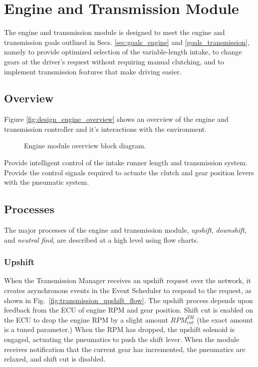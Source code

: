 \section{Engine and Transmission Module\label{sec:engine_transmission_design}}

The engine and transmission module is designed to meet the engine and transmission goals outlined in Secs. \ref{sec:goals_engine} and \ref{goals_transmission}, namely to provide optimized selection of the variable-length intake, to change gears at the driver's request without requiring manual clutching, and to implement transmission features that make driving easier. 

\subsection{Overview}

Figure \ref{fig:design_engine_overview} shows an overview of the engine and transmission controller and it's interactions with the environment.

\begin{figure}[H]
\centering

\caption{Engine module overview block diagram.}
\label{fig:design_engine_hardware_block}
\end{figure}

Provide intelligent control of the intake runner length and transmission system.
Provide the control signals required to actuate the clutch and gear position levers with the pneumatic system.

\subsection{Processes}

The major processes of the engine and transmission module, \emph{upshift}, \emph{downshift}, and \emph{neutral find}, are described at a high level using flow charts.

\subsubsection{Upshift}

When the Transmission Manager receives an upshift request over the network, it creates asynchronous events in the Event Scheduler to respond to the request, as shown in Fig.\ \ref{fig:transmission_upshift_flow}. The upshift process depends upon feedback from the ECU of engine RPM and gear position. Shift cut is enabled on the ECU to drop the engine RPM by a slight amount $RPM^{TH}_{cut}$ (the exact amount is a tuned parameter.) When the RPM has dropped, the upshift solenoid is engaged, actuating the pneumatics to push the shift lever. When the module receives notification that the current gear has incremented, the pneumatics are relaxed, and shift cut is disabled.

